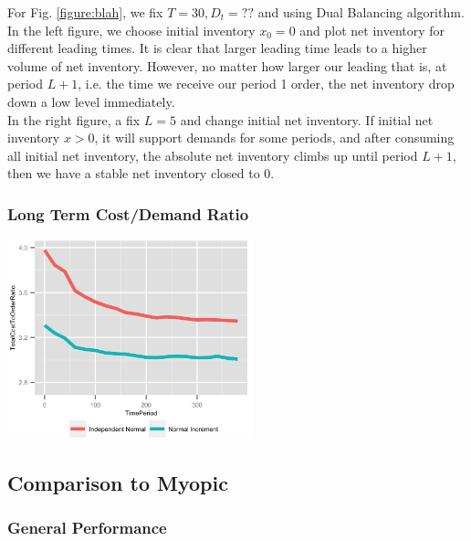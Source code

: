 \documentclass[twoside]{article}
\begin{document}
\begin{multicols}{2}
For Fig. \ref{figure:blah}, we fix $T=30, D_t=??$ and using Dual Balancing algorithm. In the left figure, we choose initial inventory $x_0 = 0$ and plot net inventory for different leading times. It is clear that larger leading time leads to a higher volume of net inventory. However, no matter how larger our leading that is, at period $L+1$, i.e. the time we receive our period 1 order, the net inventory drop down a low level immediately.\\
In the right figure, a fix $L = 5$ and change initial net inventory. If initial net inventory $x > 0$, it will support demands for some periods, and after consuming all initial net inventory, the absolute net inventory climbs up until period $L+1$, then we have a stable net inventory closed to 0.\\

\subsubsection{Long Term Cost/Demand Ratio}
\begin{center}
  \includegraphics[width=2.8in]{figures/TotalCostToOrderRatio.png}
\end{center}

\subsection{Comparison to Myopic}
\subsubsection{General Performance}


\end{multicols}
\end{document}
